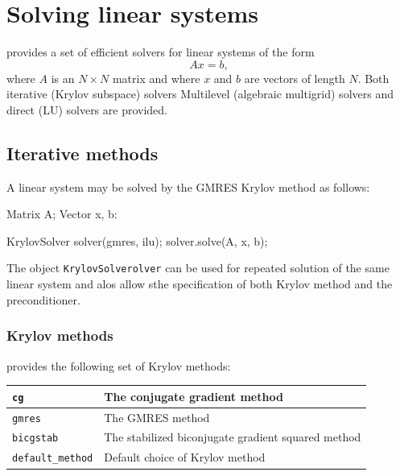 \section{Solving linear systems}

\dolfin{} provides a set of efficient solvers for linear systems of
the form
\begin{equation}
  Ax = b,
\end{equation}
where $A$ is an $N\times N$ matrix and where $x$ and $b$ are vectors
of length $N$. Both iterative (Krylov subspace) solvers Multilevel (algebraic multigrid) solvers and direct
(LU) solvers are provided.

\subsection{Iterative methods}

A linear system may be solved by the GMRES Krylov method as follows:
\begin{code}
Matrix A;
Vector x, b:

KrylovSolver solver(gmres, ilu);
solver.solve(A, x, b);
\end{code}
The object \texttt{KrylovSolverolver} can be used for repeated solution of the same linear system and alos allow sthe specification of both Krylov method and the preconditioner.

\subsubsection{Krylov methods}

\dolfin{} provides the following set of Krylov methods:

\begin{center}
\begin{tabular}{|l|l|}
\hline
\texttt{cg}              & The conjugate gradient method \\
\hline
\texttt{gmres}           & The GMRES method \\
\hline
\texttt{bicgstab}        & The stabilized biconjugate gradient squared
method \\
\hline
\texttt{default\_method} & Default choice of Krylov method \\
\hline
\end{tabular}
\end{center}

